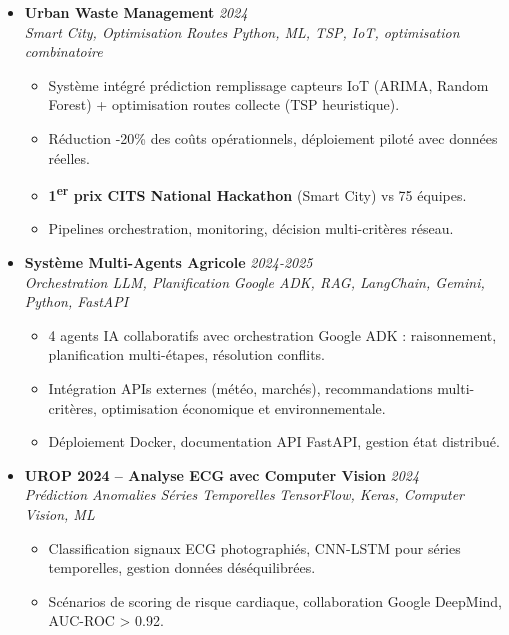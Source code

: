 \documentclass[a4paper,11pt]{article}
\begin{document}
\begin{itemize}[leftmargin=*, label={-}]
    \item \textbf{Urban Waste Management} \hfill \textit{2024} \\
    \textit{Smart City, Optimisation Routes} \hfill \textit{Python, ML, TSP, IoT, optimisation combinatoire}
    \vspace{-2pt}
    \begin{itemize}[leftmargin=0.4cm, nosep, label=\tiny$\bullet$]
        \item \small{Syst\`eme int\'egr\'e prédiction remplissage capteurs IoT (ARIMA, Random Forest) + optimisation routes collecte (TSP heuristique).}
        \item \small{R\'eduction -20\% des co\^uts op\'erationnels, d\'eploiement pilot\'e avec donn\'ees r\'eelles.}
        \item \small{\textbf{1\textsuperscript{er} prix CITS National Hackathon} (Smart City) vs 75 \'equipes.}
        \item \small{Pipelines orchestration, monitoring, d\'ecision multi-crit\`eres r\'eseau.}
    \end{itemize}
    \vspace{3pt}

    \item \textbf{Syst\`eme Multi-Agents Agricole} \hfill \textit{2024-2025} \\
    \textit{Orchestration LLM, Planification} \hfill \textit{Google ADK, RAG, LangChain, Gemini, Python, FastAPI}
    \vspace{-2pt}
    \begin{itemize}[leftmargin=0.4cm, nosep, label=\tiny$\bullet$]
        \item \small{4 agents IA collaboratifs avec orchestration Google ADK : raisonnement, planification multi-\'etapes, r\'esolution conflits.}
        \item \small{Intégration APIs externes (m\'et\'eo, march\'es), recommandations multi-crit\`eres, optimisation \'economique et environnementale.}
        \item \small{D\'eploiement Docker, documentation API FastAPI, gestion \'etat distribu\'e.}
    \end{itemize}
    \vspace{3pt}

    \item \textbf{UROP 2024 -- Analyse ECG avec Computer Vision} \hfill \textit{2024} \\
    \textit{Pr\'ediction Anomalies S\'eries Temporelles} \hfill \textit{TensorFlow, Keras, Computer Vision, ML}
    \vspace{-2pt}
    \begin{itemize}[leftmargin=0.4cm, nosep, label=\tiny$\bullet$]
        \item \small{Classification signaux ECG photographi\'es, CNN-LSTM pour s\'eries temporelles, gestion donn\'ees d\'es\'equilibr\'ees.}
        \item \small{Sc\'enarios de scoring de risque cardiaque, collaboration Google DeepMind, AUC-ROC > 0.92.}
    \end{itemize}
    \vspace{3pt}


\end{itemize}
\end{document}
